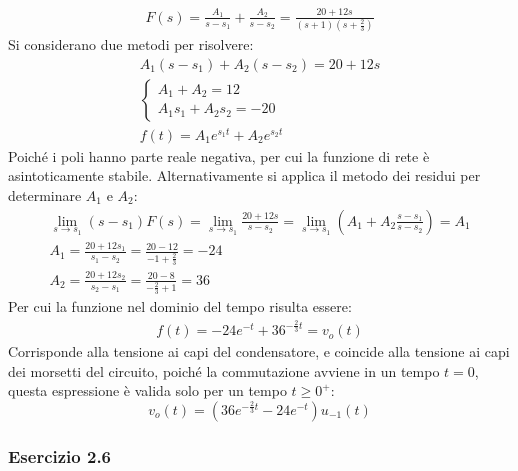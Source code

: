 \documentclass{article}
\begin{document}
\begin{gather*}
    F(s)=\displaystyle\frac{A_1}{s-s_1}+\frac{A_2}{s-s_2}=\frac{20+12s}{(s+1)\left(s+\displaystyle\frac{2}{3}\right)}
\end{gather*}
Si considerano due metodi per risolvere:
\begin{gather*}
    A_1(s-s_1)+A_2(s-s_2)=20+12s\\
    \begin{cases}
        A_1+A_2=12\\
        A_1s_1+A_2s_2=-20
    \end{cases}\\
    f(t)=A_1e^{s_1t}+A_2e^{s_2t}
\end{gather*}
Poiché i poli hanno parte reale negativa, per cui la funzione di rete è asintoticamente stabile. 
Alternativamente si applica il metodo dei residui per determinare $A_1$ e $A_2$:
\begin{gather*}
    \lim_{s\to s_1}(s-s_1)F(s)=\lim_{s\to s_1}\displaystyle\frac{20+12s}{s-s_2}=\lim_{s\to s_1}\left(A_1+A_2\frac{s-s_1}{s-s_2}\right)=A_1\\
    A_1=\displaystyle\frac{20+12s_1}{s_1-s_2}=\frac{20-12}{-1+\displaystyle\frac{2}{3}}=-24\\
    A_2=\displaystyle\frac{20+12s_2}{s_2-s_1}=\frac{20-8}{-\displaystyle\frac{2}{3}+1}=36
\end{gather*}
Per cui la funzione nel dominio del tempo risulta essere:
\begin{gather*}
    f(t)=-24e^{-t}+36^{-\frac{2}{3}t}=v_o(t)
\end{gather*}
Corrisponde alla tensione ai capi del condensatore, e coincide alla tensione ai capi dei morsetti del circuito, poiché la commutazione avviene in un tempo $t=0$, questa 
espressione è valida solo per un tempo $t\geq0^+$:
\begin{equation}
    v_o(t)=(36e^{-\frac{2}{3}t}-24e^{-t})u_{-1}(t)
\end{equation}

\subsubsection*{Esercizio 2.6}
\end{document}
